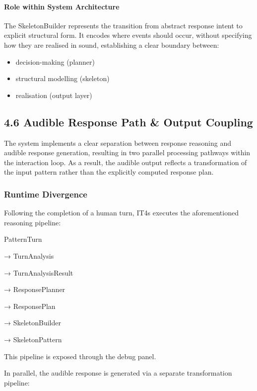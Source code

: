 \paragraph{Role within System
Architecture}\label{role-within-system-architecture}

The SkeletonBuilder represents the transition from abstract response
intent to explicit structural form. It encodes where events should
occur, without specifying how they are realised in sound, establishing a
clear boundary between:

\begin{itemize}
\item
  decision-making (planner)
\item
  structural modelling (skeleton)
\item
  realisation (output layer)
\end{itemize}

\subsection{4.6 Audible Response Path \& Output
Coupling}\label{audible-response-path-output-coupling}

The system implements a clear separation between response reasoning and
audible response generation, resulting in two parallel processing
pathways within the interaction loop. As a result, the audible output
reflects a transformation of the input pattern rather than the
explicitly computed response plan.

\subsubsection{Runtime Divergence}\label{runtime-divergence}

Following the completion of a human turn, IT4s executes the
aforementioned reasoning pipeline:

PatternTurn

→ TurnAnalysis

→ TurnAnalysisResult

→ ResponsePlanner

→ ResponsePlan

→ SkeletonBuilder

→ SkeletonPattern

This pipeline is exposed through the debug panel.

In parallel, the audible response is generated via a separate
transformation pipeline:

